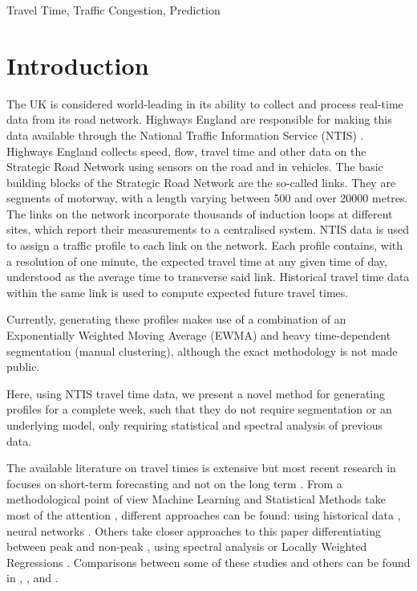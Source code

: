 \documentclass[conference, letterpaper]{IEEEtran}
\begin{document}
\begin{IEEEkeywords}
Travel Time, Traffic Congestion, Prediction
\end{IEEEkeywords}

\section{Introduction}
The UK is considered world-leading in its ability to collect and process real-time data from its road network. 
Highways England are responsible for making this data available through the National Traffic Information Service (NTIS) \cite{NTIS}. 
Highways England collects speed, flow, travel time and other data on the Strategic Road Network using sensors on the road and in vehicles. 
The basic building blocks of the Strategic Road Network are the so-called links. 
They are segments of motorway, with a length varying between 500 and over 20000 metres.  
The links on the network incorporate thousands of induction loops at different sites, which report their measurements to a centralised system.
NTIS data is used to assign a traffic profile to each link on the network. 
Each profile contains, with a resolution of one minute, the expected travel time at any given time of day, understood as the average time to transverse said link.
Historical travel time data within the same link is used to compute expected future travel times.

Currently, generating these profiles makes use of a combination of an Exponentially Weighted Moving Average (EWMA) and heavy time-dependent segmentation (manual clustering), although the exact methodology is not made public.

Here, using NTIS travel time data, we present a novel method for generating profiles for a complete week, such that they do not require segmentation or an underlying model, only requiring statistical and spectral analysis of previous data.

The available literature on travel times is extensive but most recent research in focuses on short-term forecasting and not on the long term \cite{long-term} \cite{long-term-2}. From a methodological point of view Machine Learning and Statistical Methods take most of the attention \cite{should}, different approaches can be found: using historical data \cite{simple} \cite{dynamic-historic}, neural networks \cite{NN}.
Others take closer approaches to this paper differentiating between peak and non-peak \cite{peak-historic}, using spectral analysis \cite{spectral1} \cite{spectral2} or Locally Weighted Regressions \cite{williams} \cite{sun} \cite{zhong} \cite{chowdhury} \cite{acqua} \cite{vana}.
Comparisons between some of these studies and others can be found in \cite{nikovski}, \cite{lint}, \cite{mori} and \cite{ser}.
\end{document}
